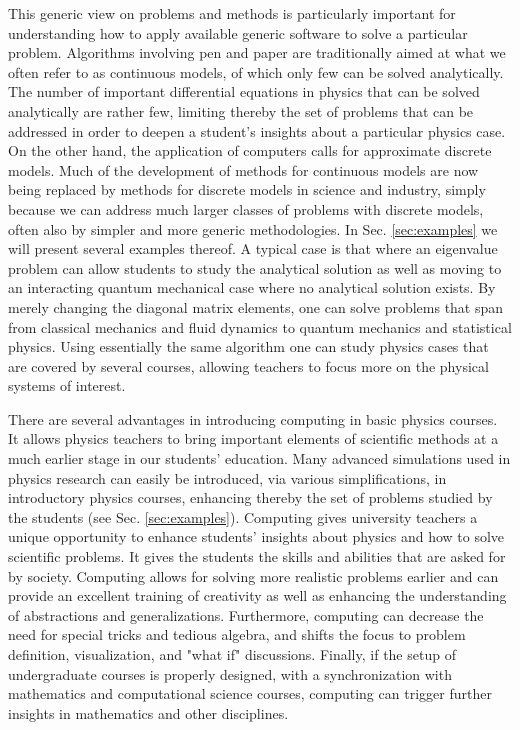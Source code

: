 \documentclass[graybox,envcountchap,sectrefs]{svmult}
\begin{document}
This generic view on problems and methods is particularly important for
understanding how to apply available generic software to solve a
particular problem.  Algorithms involving pen and paper are
traditionally aimed at what we often refer to as continuous models, of
which only few can be solved analytically. The number of important
differential equations in physics that can be solved analytically are
rather few, limiting thereby the set of problems that can be addressed
in order to deepen a student's insights about a particular physics
case. On the other hand, the application of computers calls for
approximate discrete models.  Much of the development of methods for
continuous models are now being replaced by methods for discrete
models in science and industry, simply because we can address much
larger classes of problems with discrete models, often also by simpler
and more generic methodologies.  In Sec. \ref{sec:examples} we will present
several examples thereof. A typical case is that where an eigenvalue
problem can allow students to study the analytical solution as well as
moving to an interacting quantum mechanical case where no analytical
solution exists. By merely changing the diagonal matrix elements, one
can solve problems that span from classical mechanics and fluid
dynamics to quantum mechanics and statistical physics.  Using
essentially the same algorithm one can study physics cases that
are covered by several courses, allowing teachers to focus
more on the physical systems of interest.

There are several advantages in  introducing computing in basic physics
courses. It allows physics teachers to bring important elements of
scientific methods at a much earlier stage in our students'
education. Many advanced simulations used in physics research can
easily be introduced, via various simplifications, in introductory
physics courses, enhancing thereby the set of problems studied by the
students (see Sec. \ref{sec:examples}). Computing gives university
teachers a unique opportunity to enhance students' insights about
physics and how to solve scientific problems. It gives the
students the skills and abilities that are asked for by
society. Computing allows for solving more realistic problems earlier
and can provide an excellent training of creativity as well as enhancing the
understanding of abstractions and generalizations. Furthermore,
computing can decrease the need for special tricks and tedious
algebra, and shifts the focus to problem definition, visualization,
and "what if" discussions. Finally, if the setup of undergraduate
courses is properly designed, with a synchronization with mathematics
and computational science courses, computing can trigger further
insights in mathematics and other disciplines.
\end{document}
